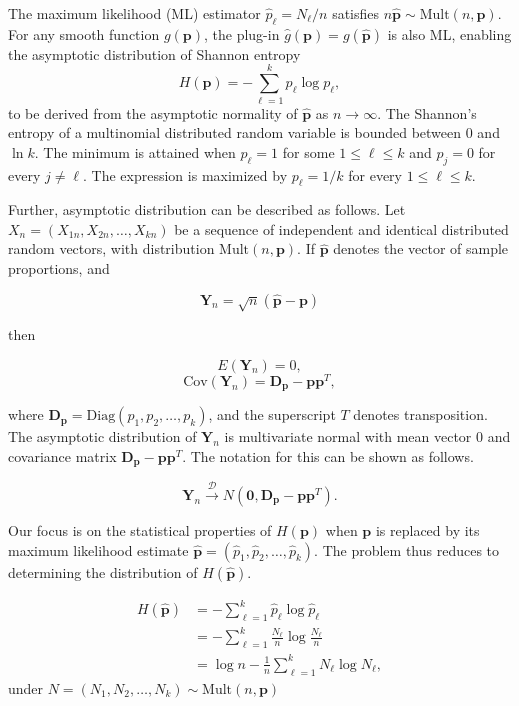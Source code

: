 The maximum likelihood (ML) estimator $\widehat{p}_\ell = N_\ell / n$ satisfies $n\widehat{\mathbf{p}} \sim \mathrm{Mult}(n,\mathbf{p})$. For any smooth function $g(\mathbf{p})$, the plug-in $\widehat{g}(\mathbf{p}) = g(\widehat{\mathbf{p}})$ is also ML, enabling the asymptotic distribution of Shannon entropy
\begin{equation}
	H(\mathbf{p}) = -\sum_{\ell=1}^k p_\ell \log p_\ell,
	\label{eq:AsymEntropy}
\end{equation}
to be derived from the asymptotic normality of $\widehat{\mathbf{p}}$ as $n \to \infty$.
The Shannon's entropy of a multinomial distributed random variable is bounded between 0 and $\ln k$. The minimum is attained when $p_{\ell}=1$ for some $1\leq \ell \leq k$ and $p_j=0$ for every $j\ne \ell$. The expression is maximized by $p_{\ell}=1/k$ for every $1\leq \ell \leq k$.  

Further, asymptotic distribution can be described as follows. Let $X_n=(X_{1n},X_{2n},\dots,X_{kn})$ be a sequence of independent and identical distributed random vectors, with distribution $\text{Mult}(n,\mathbf{p})$. If $\widehat{\mathbf{p}}$ denotes the vector of sample proportions, and 

\[\mathbf{Y}_n=\sqrt{n}(\widehat{\mathbf{p}}-\mathbf{p})\] 

then

\[E(\mathbf{Y}_n)=0,\]
\[\text{Cov}(\mathbf{Y}_n)=\mathbf{D_p}-\mathbf{pp}^T,\]

where $\mathbf{D_p}=\text{Diag}(p_1,p_2,\dots,p_k)$, and the superscript $T$ denotes transposition. The asymptotic distribution of $\mathbf{Y}_n$ is multivariate normal with mean vector $0$ and covariance matrix $\mathbf{D_p}-\mathbf{pp}^T.$ The notation for this can be shown as follows.

\begin{equation}
	\mathbf{Y}_n \xrightarrow{\mathscr{D}} N(\mathbf{0}, \mathbf{D_p}-\mathbf{pp}^T).
	\label{eq:Cov} 
\end{equation}
 
Our focus is on the statistical properties of $H(\mathbf{p})$ when $\mathbf{p}$ is replaced by its maximum likelihood estimate $\widehat{\mathbf{p}} = (\widehat{p}_1, \widehat{p}_2, \dots, \widehat{p}_k)$. The problem thus reduces to determining the distribution of $H(\widehat{\mathbf{p}})$.

\begin{align}
	H(\widehat{\mathbf{p}})
	&= -\sum_{\ell=1}^k \widehat{p}_\ell \log \widehat{p}_\ell \nonumber \\
	&= -\sum_{\ell=1}^k \frac{N_\ell}{n} \log \frac{N_\ell}{n} \nonumber \\
	&= \log n - \frac{1}{n} \sum_{\ell=1}^k N_\ell \log N_\ell,
\end{align}
under $N=(N_1,N_2,\dots,N_k)\sim \text{Mult}(n,\mathbf{p})$


